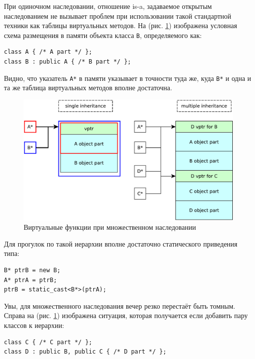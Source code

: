 \documentclass[a4paper,12pt,oneside]{book}
\begin{document}
При одиночном наследовании, отношение is-a, задаваемое открытым наследованием не вызывает проблем при использовании такой стандартной техники как таблицы виртуальных методов. На (рис. \ref{fig:multinh-crop}) изображена условная схема размещения в памяти объекта класса \lstinline!B!, определяемого как:

\begin{lstlisting}
class A { /* A part */ };
class B : public A { /* B part */ };
\end{lstlisting}

Видно, что указатель \lstinline!A*! в памяти указывает в точности туда же, куда \lstinline!B*! и одна и та же таблица виртуальных методов вполне достаточна.

\begin{figure}[h!]
\centering
\includegraphics[width=1.0\textwidth]{illustrations/multinh-crop.pdf}
\caption{Виртуальные функции при множественном наследовании}
\label{fig:multinh-crop}
\end{figure}

Для прогулок по такой иерархии вполне достаточно статического приведения типа:

\begin{lstlisting}
B* ptrB = new B;
A* ptrA = ptrB;
ptrB = static_cast<B*>(ptrA);
\end{lstlisting}

Увы, для множественного наследования вечер резко перестаёт быть томным. Справа на (рис. \ref{fig:multinh-crop}) изображена ситуация, которая получается если добавить пару классов к иерархии:

\begin{lstlisting}
class C { /* C part */ };
class D : public B, public C { /* D part */ };
\end{lstlisting}
\end{document}
